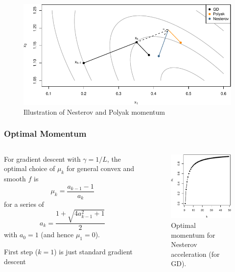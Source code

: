 \documentclass[aspectratio=1610,onlytextwidth]{beamer}
\begin{document}
\begin{frame}[c]
  \begin{figure}[htpb]
    \centering
    \includegraphics[]{images/momentum-illustration.pdf}
    \caption{%
      Illustration of Nesterov and Polyak momentum
    }
  \end{figure}
\end{frame}

\begin{frame}[c]
  \frametitle{Optimal Momentum}
  \begin{columns}
    \begin{column}{0.45\textwidth}
      For gradient descent with \(\gamma = 1/L\), the optimal choice of \(\mu_k\) for
      general convex and smooth \(f\) is
      \[
        \mu_k = \frac{a_{k-1} - 1}{a_{k}}
      \]
      for a series of
      \[
        a_k = \frac{1 + \sqrt{4a_{k-1}^2 + 1}}{2}
      \]
      with \(a_0 = 1\) (and hence \(\mu_1 = 0\)).

      \bigskip\pause

      First step (\(k = 1\)) is just standard gradient descent
    \end{column}
    \begin{column}{0.45\textwidth}
      \begin{figure}[htpb]
        \centering
        \includegraphics[]{images/nesterov-weights.pdf}
        \caption{%
          Optimal momentum for Nesterov acceleration (for GD).
        }
      \end{figure}

    \end{column}
  \end{columns}
\end{frame}
\end{document}
